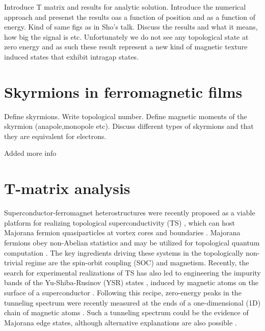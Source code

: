 \documentclass[twocolumn,showpacs,floatfix,nofootinbib,longbibliography]{revtex4-1}
\begin{document}
Introduce T matrix and results for analytic solution.  
Introduce the numerical approach and presenst the results oas a function of position and as a function of energy. Kind of same figs as in Sho’s talk. 
Discuss the results and what it means, how big the signal is etc. Unfortunately we do not see any topological state at zero energy and as such these result represent a new kind of magnetic texture induced states that exhibit intragap states.


\section{Skyrmions in ferromagnetic films} \label{sec:skyrmion}
Define skyrmions.  Write topological number. Define magnetic moments of the skyrmion (anapole,monopole etc). Discuss different types of skyrmions and that they are equivalent for electrons. 

Added more info


\section{T-matrix analysis} \label{sec:analytics}
Superconductor-ferromagnet heterostructures were recently proposed as a viable platform for realizing topological superconductivity (TS) \cite{Lutchyn2010,Oreg2010, Sau2010}, which can host Majorana fermion quasiparticles at vortex cores and boundaries \cite{Kitaev2001, Alicea, Beenakker2013}. Majorana fermions obey non-Abelian statistics and may be utilized for topological quantum computation \cite{Read2000, Ivanov2001, Nayak2008}.  The key ingredients driving these systems in the topologically non-trivial regime are the spin-orbit coupling (SOC) and magnetism. Recently, the search for experimental realizations of TS has also led to engineering the impurity bands of the Yu-Shiba-Rusinov (YSR) states \cite{Yu,Shiba,Rusinov}, induced by magnetic atoms on the surface of a superconductor \cite{Choy2011, Nadj-Perge2013, Klinovaja2013, Vazifeh2013, Braunecker2013, Pientka2013, Nakosai2013, Poyhonen2014, Reis2014, Brydon2015, Rontynen2014, Li2015}. Following this recipe, zero-energy peaks in the tunneling spectrum were recently measured at the ends of a one-dimensional (1D) chain of magnetic atoms \cite{Yazdani2014}. Such a tunneling spectrum could be the evidence of Majorana edge states, although alternative explanations are also possible \cite{Sau2015}.
\end{document}
